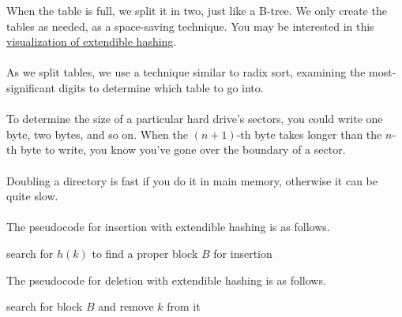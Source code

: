 \documentclass[]{article}
\theoremstyle{definition}
\begin{document}
			When the table is full, we split it in two, just like a B-tree. We only create the tables as needed, as a space-saving technique. You may be interested in this \href{http://underpop.free.fr/j/java/algorithims-in-java-1-4/images/16fig13.gif}{visualization of extendible hashing}.
			\\ \\
			As we split tables, we use a technique similar to radix sort, examining the most-significant digits to determine which table to go into.
			\\ \\
			To determine the size of a particular hard drive's sectors, you could write one byte, two bytes, and so on. When the $(n + 1)$-th byte takes longer than the $n$-th byte to write, you know you've gone over the boundary of a sector.
			\\ \\
			Doubling a directory is fast if you do it in main memory, otherwise it can be quite slow.
			\\ \\
			The pseudocode for insertion with extendible hashing is as follows. \\
			\begin{algorithm}[H]
				search for $h(k)$ to find a proper block $B$ for insertion\;
			\end{algorithm}

			The pseudocode for deletion with extendible hashing is as follows. \\
			\begin{algorithm}[H]
				search for block $B$ and remove $k$ from it\;
			\end{algorithm}
\end{document}
